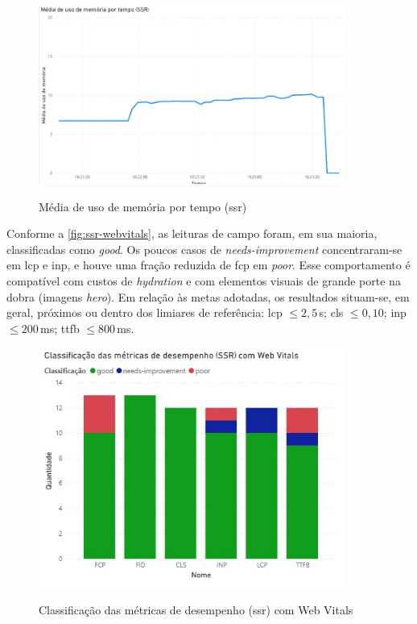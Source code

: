 {\begin{figure}[H]
    \centering
    \caption{Média de uso de memória por tempo (\acrshort{ssr})}
    \includegraphics[width=0.9\textwidth]{media/uso_memoria_ssr.jpeg}
    \label{fig:ssr-mem}
\end{figure}

Conforme a \autoref{fig:ssr-webvitals}, as leituras de campo foram, em sua maioria, classificadas como \textit{good}. Os poucos casos de \textit{needs-improvement} concentraram-se em \acrshort{lcp} e \acrshort{inp}, e houve uma fração reduzida de \acrshort{fcp} em \textit{poor}. Esse comportamento é compatível com custos de \textit{hydration} e com elementos visuais de grande porte na dobra (imagens \emph{hero}). Em relação às metas adotadas, os resultados situam-se, em geral, próximos ou dentro dos limiares de referência: \acrshort{lcp} $\leq 2{,}5$\,s; \acrshort{cls} $\leq 0{,}10$; \acrshort{inp} $\leq 200$\,ms; \acrshort{ttfb} $\leq 800$\,ms.

\begin{figure}[H]
    \centering
    \caption{Classificação das métricas de desempenho (\acrshort{ssr}) com Web Vitals}
    \includegraphics[width=0.9\textwidth]{media/metricas_ssr_web_vitals.jpeg}
    \label{fig:ssr-webvitals}
\end{figure}

}
